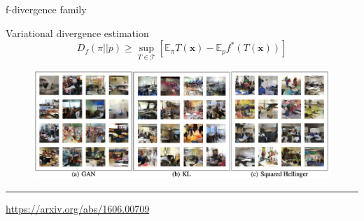 \documentclass{beamer}
\newcommand{\bx}{\mathbf{x}}
\newcommand{\bbE}{\mathbb{E}}
\newcommand{\cT}{\mathcal{T}}
\begin{document}
\begin{frame}{f-divergence family}
	\begin{block}{Variational divergence estimation}
		\[
			D_f(\pi || p) \geq \sup_{T \in \cT} \left[\bbE_{\pi}T(\bx) -  \bbE_p f^*(T(\bx)) \right]
		\]
	\end{block}
	\begin{figure}
		\centering
		\includegraphics[width=1.0\linewidth]{figs/f_div_results}
	\end{figure}
	\vfill
	\hrule\medskip 
	{\scriptsize \href{https://arxiv.org/abs/1606.00709}{https://arxiv.org/abs/1606.00709}}
\end{frame}
\end{document}
